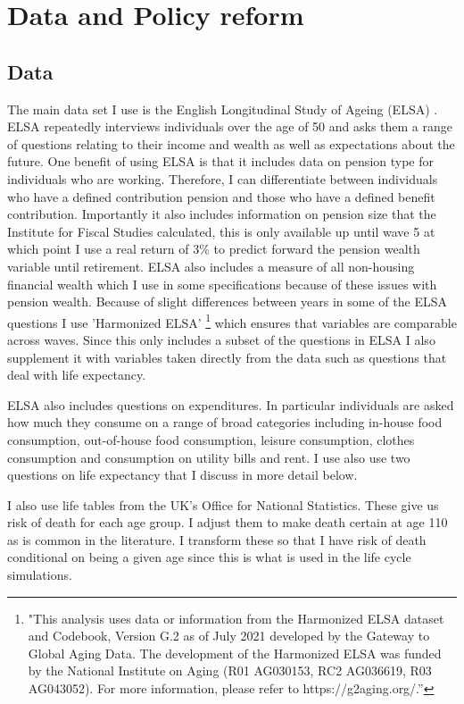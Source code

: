 \documentclass[12pt]{article}
\begin{document}
\section{Data and Policy reform}

\subsection{Data}

The main data set I use is the English Longitudinal Study of Ageing (ELSA) \cite{main_elsa_citation}. ELSA repeatedly interviews
individuals over the age of 50 and asks them a range of questions relating to their income and wealth as well as expectations about
the future. One benefit of using ELSA is that it includes data on pension type for individuals who are working. Therefore,
I can differentiate between individuals who have a defined contribution pension and those who have a defined benefit contribution.
Importantly it also includes information on pension size that the Institute for Fiscal Studies calculated, this is only available
up until wave 5 at which point I use a real return of 3\% to predict forward the pension wealth variable until retirement.
ELSA also includes a measure of all non-housing financial wealth which I use in some specifications because of these issues with
pension wealth. Because of slight differences between years in some of the ELSA questions I use 'Harmonized ELSA'
\footnote{"This analysis uses data or information from the Harmonized ELSA dataset and Codebook, Version G.2 as of
  July 2021 developed by the Gateway to Global Aging Data. The development of the Harmonized ELSA was funded by the National
  Institute on Aging (R01 AG030153, RC2 AG036619, R03 AG043052). For more information,
  please refer to https://g2aging.org/.”} which ensures that variables are comparable across waves. Since this only includes a
subset of the questions in ELSA I also supplement it with variables taken directly from the data such as questions that deal
with life expectancy.

ELSA also includes questions on expenditures. In particular individuals are asked how much they consume on a range of broad
categories including in-house food consumption, out-of-house food consumption, leisure consumption, clothes consumption and
consumption on utility bills and rent. I use also use two questions on life expectancy that I discuss in more detail below.

I also use life tables from the UK's Office for National Statistics. These give us risk of death for each age group. I adjust them
to make death certain at age 110 as is common in the literature. I transform these so that I have risk of death conditional on being
a given age since this is what is used in the life cycle simulations.
\end{document}
